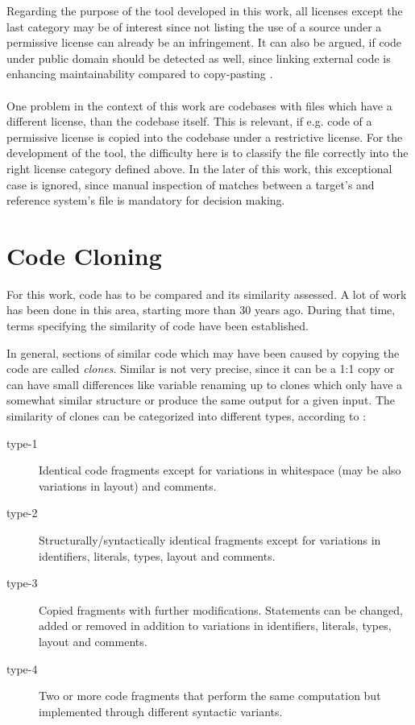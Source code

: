 Regarding the purpose of the tool developed in this work, all licenses except the last category may be of interest since not listing the use of a source under a permissive license can already be an infringement.
It can also be argued, if code under public domain should be detected as well, since linking external code is enhancing maintainability compared to copy-pasting \cite{heinemann2012effective}.
\\ \\
\noindent
One problem in the context of this work are codebases with files which have a different license, than the codebase itself.
This is relevant, if e.g. code of a permissive license is copied into the codebase under a restrictive license.
For the development of the tool, the difficulty here is to classify the file correctly into the right license category defined above.
In the later of this work, this exceptional case is ignored, since manual inspection of matches between a target's and reference system's file is mandatory for decision making.

\section{Code Cloning}
For this work, code has to be compared and its similarity assessed.
A lot of work has been done in this area, starting more than 30 years ago\cite{lancaster2004comparison}.
During that time, terms specifying the similarity of code have been established.

In general, sections of similar code which may have been caused by copying the code are called \textit{clones}.
Similar is not very precise, since it can be a 1:1 copy or can have small differences like variable renaming up to clones which only have a somewhat similar structure or produce the same output for a given input.
The similarity of clones can be categorized into different types, according to \cite{roy2007survey}:

\begin{description}
	\item[type-1] Identical code fragments except for variations in whitespace (may be also variations in layout) and comments.
	\item[type-2] Structurally/syntactically identical fragments except for variations in identifiers, literals, types, layout and comments.
	\item[type-3] Copied fragments with further modifications. Statements can be changed, added or removed in addition to variations in identifiers, literals, types, layout and comments.
	\item[type-4] Two or more code fragments that perform the same computation but implemented through different syntactic variants.
\end{description}

